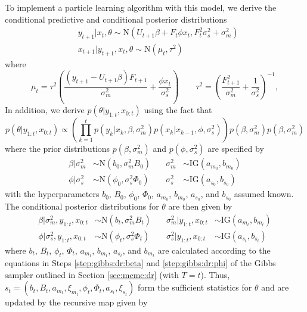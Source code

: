 To implement a particle learning algorithm with this model, we derive the conditional predictive and conditional posterior distributions
\begin{align}
&y_{t+1}|x_t,\theta \sim \mbox{N}(U_{t+1}\beta + F_t\phi x_t, F_t^2\sigma^2_s + \sigma^2_m) \label{eqn:pl:dr:pred} \\
&x_{t+1}|y_{t+1},x_t,\theta \sim \mbox{N}(\mu_t,\tau^2) \label{eqn:pl:dr:state}
\end{align}
where \[\mu_t = \tau^2\left(\frac{(y_{t+1}-U_{t+1}\beta)F_{t+1}}{\sigma^2_m} + \frac{\phi x_t}{\sigma^2_s}\right) \qquad \tau^2 = \left(\frac{F_{t+1}^2}{\sigma^2_m} + \frac{1}{\sigma^2_s}\right)^{-1},\]
In addition, we derive $p(\theta|y_{1:t},x_{0:t})$ using the fact that
\begin{equation}
p(\theta|y_{1:t},x_{0:t}) \propto \left(\prod_{k=1}^t p(y_k|x_k,\beta,\sigma^2_m)p(x_k|x_{k-1},\phi,\sigma^2_s)\right)p(\beta,\sigma^2_m)p(\beta,\sigma^2_m) \label{eqn:pl:dr:theta}
\end{equation}
where the prior distributions $p(\beta,\sigma^2_m)$ and $p(\phi,\sigma^2_s)$ are specified by
\begin{align}
\beta|\sigma^2_m &\sim \mbox{N}(b_0, \sigma^2_m B_0) &\quad \sigma^2_m &\sim \mbox{IG}(a_{m_0},b_{m_0}) \label{eqn:pl:prior:beta} \\
\phi|\sigma^2_s &\sim \mbox{N}(\phi_0, \sigma^2_s \Phi_0) &\quad \sigma^2_s &\sim \mbox{IG}(a_{s_0},b_{s_0}) \label{eqn:pl:prior:phi}
\end{align}
with the hyperparameters $b_0$, $B_0$, $\phi_0$, $\Phi_0$, $a_{m_0}$, $b_{m_0}$, $a_{s_0}$, and $b_{s_0}$ assumed known. The conditional posterior distributions for $\theta$ are then given by
\begin{align}
\beta|\sigma^2_m,y_{1:t},x_{0:t} &\sim \mbox{N}(b_t, \sigma^2_m B_t) &\quad \sigma^2_m|y_{1:t},x_{0:t} &\sim \mbox{IG}(a_{m_t},b_{m_t}) \label{eqn:pl:post:beta} \\
\phi|\sigma^2_s,y_{1:t},x_{0:t} &\sim \mbox{N}(\phi_t, \sigma^2_s \Phi_t) &\quad \sigma^2_s|y_{1:t},x_{0:t} &\sim \mbox{IG}(a_{s_t},b_{s_t}) \label{eqn:pl:post:phi}
\end{align}
where $b_t$, $B_t$, $\phi_t$, $\Phi_t$, $a_{m_t}$, $b_{m_t}$, $a_{s_t}$, and $b_{m_t}$ are calculated according to the equations in Steps \ref{step:gibbs:dr:beta} and \ref{step:gibbs:dr:phi} of the Gibbs sampler outlined in Section \ref{sec:mcmc:dr} (with $T = t$). Thus, $s_t = (b_t, B_t, a_{m_t}, \xi_{m_t}, \phi_t, \Phi_t, a_{s_t}, \xi_{s_t})$ form the sufficient statistics for $\theta$ and are updated by the recursive map given by
